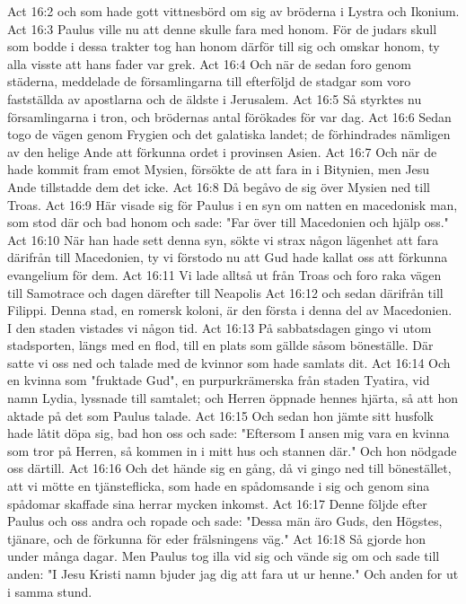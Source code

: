 Act 16:2  och som hade gott vittnesbörd om sig av bröderna i Lystra och Ikonium.
Act 16:3  Paulus ville nu att denne skulle fara med honom. För de judars skull som bodde i dessa trakter tog han honom därför till sig och omskar honom, ty alla visste att hans fader var grek.
Act 16:4  Och när de sedan foro genom städerna, meddelade de församlingarna till efterföljd de stadgar som voro fastställda av apostlarna och de äldste i Jerusalem.
Act 16:5  Så styrktes nu församlingarna i tron, och brödernas antal förökades för var dag.
Act 16:6  Sedan togo de vägen genom Frygien och det galatiska landet; de förhindrades nämligen av den helige Ande att förkunna ordet i provinsen Asien.
Act 16:7  Och när de hade kommit fram emot Mysien, försökte de att fara in i Bitynien, men Jesu Ande tillstadde dem det icke.
Act 16:8  Då begåvo de sig över Mysien ned till Troas.
Act 16:9  Här visade sig för Paulus i en syn om natten en macedonisk man, som stod där och bad honom och sade: "Far över till Macedonien och hjälp oss."
Act 16:10  När han hade sett denna syn, sökte vi strax någon lägenhet att fara därifrån till Macedonien, ty vi förstodo nu att Gud hade kallat oss att förkunna evangelium för dem.
Act 16:11  Vi lade alltså ut från Troas och foro raka vägen till Samotrace och dagen därefter till Neapolis
Act 16:12  och sedan därifrån till Filippi. Denna stad, en romersk koloni, är den första i denna del av Macedonien. I den staden vistades vi någon tid.
Act 16:13  På sabbatsdagen gingo vi utom stadsporten, längs med en flod, till en plats som gällde såsom böneställe. Där satte vi oss ned och talade med de kvinnor som hade samlats dit.
Act 16:14  Och en kvinna som "fruktade Gud", en purpurkrämerska från staden Tyatira, vid namn Lydia, lyssnade till samtalet; och Herren öppnade hennes hjärta, så att hon aktade på det som Paulus talade.
Act 16:15  Och sedan hon jämte sitt husfolk hade låtit döpa sig, bad hon oss och sade: "Eftersom I ansen mig vara en kvinna som tror på Herren, så kommen in i mitt hus och stannen där." Och hon nödgade oss därtill.
Act 16:16  Och det hände sig en gång, då vi gingo ned till bönestället, att vi mötte en tjänsteflicka, som hade en spådomsande i sig och genom sina spådomar skaffade sina herrar mycken inkomst.
Act 16:17  Denne följde efter Paulus och oss andra och ropade och sade: "Dessa män äro Guds, den Högstes, tjänare, och de förkunna för eder frälsningens väg."
Act 16:18  Så gjorde hon under många dagar. Men Paulus tog illa vid sig och vände sig om och sade till anden: "I Jesu Kristi namn bjuder jag dig att fara ut ur henne." Och anden for ut i samma stund.
